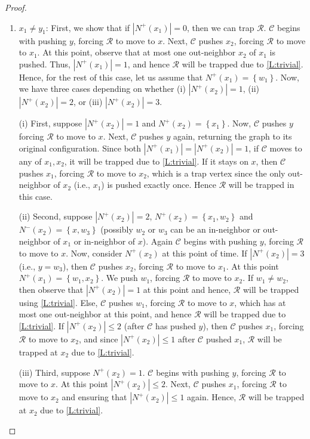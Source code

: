 \documentclass[a4paper,12pt]{amsart}
\newcommand{\set}[1]{\left\{#1\right\}}
\newcommand{\R}{\mathcal{R}}
\newcommand{\C}{\mathcal{C}}
\newenvironment{proofofclaim}{%
  \renewcommand{\proofname}{Proof of Claim}\proof}{\endproof}
\let\leq\leqslant
\begin{document}
\begin{proof}
\begin{proofofclaim}
\begin{enumerate}
\begin{enumerate}
                \item $x_1\neq y_1$: First, we show that if $|N^+(x_1)| = 0$, then we can trap $\R$. $\C$ begins with pushing $y$, forcing $\R$ to move to $x$. Next, $\C$ pushes $x_2$, forcing $\R$ to move to $x_1$. At this point, observe that at most one out-neighbor $x_2$ of $x_1$ is pushed. Thus, $|N^+(x_1)|=1$, and hence $\R$ will be trapped due to \cref{L:trivial}. Hence, for the rest of this case, let us assume that $N^+(x_1) = \set{w_1}$. Now, we have three cases depending on whether (i) $|N^+(x_2)| =1$, (ii) $|N^+(x_2)| = 2$, or (iii) $|N^+(x_2)|=3$.

                \smallskip
                (i) First, suppose $|N^+(x_2)| = 1$ and  $N^+(x_2) = \set{x_1}$. Now, $\C$ pushes $y$ forcing $\R$ to move to $x$. Next, $\C$ pushes $y$ again, returning the graph to its original configuration. Since both $|N^+(x_1)| = |N^+(x_2)| =1$, if $\C$ moves to any of $x_1,x_2$, it will be trapped due to \cref{L:trivial}. If it stays on $x$, then $\C$ pushes $x_1$, forcing $\R$ to move to $x_2$, which is a trap vertex since the only out-neighbor of $x_2$ (i.e., $x_1$) is pushed exactly once. Hence $\R$ will be trapped in this case. 

                \smallskip
                (ii) Second, suppose $|N^+(x_2)| = 2$, $N^+(x_2) = \set{x_1,w_2}$ and $N^-(x_2) = \set{x,w_3}$ (possibly $w_2$ or $w_3$ can be an in-neighbor or out-neighbor of $x_1$ or in-neighbor of $x$). Again $\C$ begins with pushing $y$, forcing $\R$ to move to $x$. Now, consider $N^+(x_2)$ at this point of time. If $|N^+(x_2)| = 3$ (i.e., $y=w_3$), then $\C$ pushes $x_2$, forcing $\R$ to move to $x_1$. At this point $N^+(x_1)=\set{w_1,x_2}$. We push $w_1$, forcing $\R$ to move to $x_2$. If $w_1\neq w_2$, then observe that $|N^+(x_2)| =1$ at this point and hence, $\R$ will be trapped using \cref{L:trivial}. Else, $\C$ pushes $w_1$, forcing $\R$ to move to $x$, which has at most one out-neighbor at this point, and hence $\R$ will be trapped due to \cref{L:trivial}. If $|N^+(x_2)| \leq 2$ (after $\C$ has pushed $y$), then $\C$ pushes $x_1$, forcing $\R$ to move to $x_2$, and since $|N^+(x_2)| \leq 1$ after $\C$ pushed $x_1$, $\R$ will be trapped at $x_2$ due to \cref{L:trivial}.

                \smallskip
                (iii) Third, suppose $N^+(x_2) = 1$. $\C$ begins with pushing $y$, forcing $\R$ to move to $x$. At this point $|N^+(x_2)| \leq 2$. Next, $\C$ pushes $x_1$, forcing $\R$ to move to $x_2$ and ensuring that $|N^+(x_2)|\leq 1$ again. Hence, $\R$ will be trapped at $x_2$ due to \cref{L:trivial}. 


\end{enumerate}
\end{enumerate}
\end{proofofclaim}
\end{proof}
\end{document}

